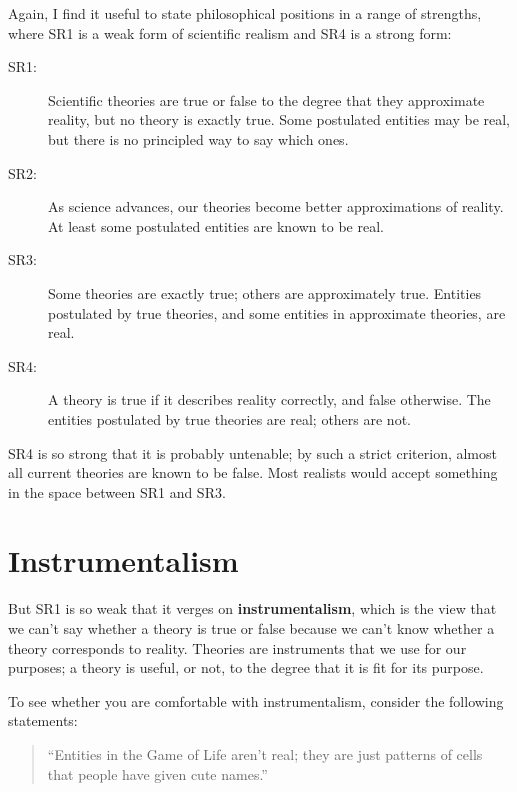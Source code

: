 \documentclass[10pt]{book}
\begin{document}
Again, I find it useful to state philosophical positions in a range of
strengths, where SR1 is a weak form of scientific realism and SR4 is a
strong form:

\begin{description}

\item[SR1:] Scientific theories are true or false to the degree that
  they approximate reality, but no theory is exactly true.  Some
  postulated entities may be real, but there is no principled way to
  say which ones.

\item[SR2:] As science advances, our theories become better
  approximations of reality.  At least some postulated entities are
  known to be real.

\item[SR3:] Some theories are exactly true; others are approximately
  true.  Entities postulated by true theories, and some entities
  in approximate theories, are real.

\item[SR4:] A theory is true if it describes reality correctly, and
  false otherwise.  The entities postulated by true theories are real;
  others are not.

\end{description}

SR4 is so strong that it is probably untenable; by such a strict
criterion, almost all current theories are known to be false.
Most realists would accept something in the space
between SR1 and SR3.


\section{Instrumentalism}

But SR1 is so weak that it verges on {\bf instrumentalism}, which is
the view that we can't say whether a theory is true or false because
we can't know whether a theory corresponds to reality.  Theories are
instruments that we use for our purposes; a theory is useful, or not,
to the degree that it is fit for its purpose.

To see whether you are comfortable with instrumentalism, consider
the following statements:

\begin{quote}
``Entities in the Game of Life aren't real; they are just patterns of
  cells that people have given cute names.''
\end{quote}
\end{document}
